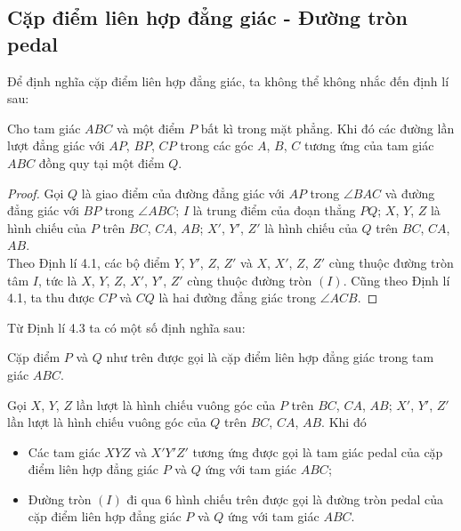         \subsection{Cặp điểm liên hợp đẳng giác - Đường tròn pedal}

        Để định nghĩa cặp điểm liên hợp đẳng giác, ta không thể không nhắc đến định lí sau:
        
        \begin{theorem}
            Cho tam giác \(ABC\) và một điểm \(P\) bất kì trong mặt phẳng. Khi đó các đường lần lượt đẳng giác với \(AP\), \(BP\), \(CP\) trong các góc \(A\), \(B\), \(C\) tương ứng của tam giác \(ABC\) đồng quy tại một điểm \(Q\).
        \end{theorem}

        \begin{proof}
            Gọi \(Q\) là giao điểm của đường đẳng giác với \(AP\) trong \(\angle BAC\) và đường đẳng giác với \(BP\) trong \(\angle ABC\); \(I\) là trung điểm của đoạn thẳng \(PQ\); \(X\), \(Y\), \(Z\) là hình chiếu của \(P\) trên \(BC\), \(CA\), \(AB\); \(X'\), \(Y'\), \(Z'\) là hình chiếu của \(Q\) trên \(BC\), \(CA\), \(AB\).\\
            Theo Định lí 4.1, các bộ điểm \(Y\), \(Y'\), \(Z\), \(Z'\) và \(X\), \(X'\), \(Z\), \(Z'\) cùng thuộc đường tròn tâm \(I\), tức là \(X\), \(Y\), \(Z\), \(X'\), \(Y'\), \(Z'\) cùng thuộc đường tròn \((I)\). Cũng theo Định lí 4.1, ta thu được \(CP\) và \(CQ\) là hai đường đẳng giác trong \(\angle ACB\).
        \end{proof}

        Từ Định lí 4.3 ta có một số định nghĩa sau:

        \begin{definition}
            Cặp điểm \(P\) và \(Q\) như trên được gọi là cặp điểm liên hợp đẳng giác trong tam giác \(ABC\).
        \end{definition}

        \begin{definition}
            Gọi \(X\), \(Y\), \(Z\) lần lượt là hình chiếu vuông góc của \(P\) trên \(BC\), \(CA\), \(AB\); \(X'\), \(Y'\), \(Z'\) lần lượt là hình chiếu vuông góc của \(Q\) trên \(BC\), \(CA\), \(AB\). Khi đó
            \begin{itemize}
                \item Các tam giác \(XYZ\) và \(X'Y'Z'\) tương ứng được gọi là tam giác pedal của cặp điểm liên hợp đẳng giác \(P\) và \(Q\) ứng với tam giác \(ABC\);
                \item Đường tròn \((I)\) đi qua 6 hình chiếu trên được gọi là đường tròn pedal của cặp điểm liên hợp đẳng giác $P$ và $Q$ ứng với tam giác \(ABC\).
            \end{itemize}
        \end{definition}

